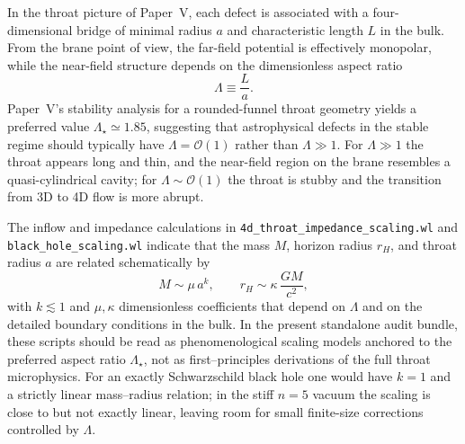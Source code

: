 \documentclass[11pt]{article}
\begin{document}
In the throat picture of Paper~V, each defect is associated with a
four-dimensional bridge of minimal radius \(a\) and characteristic length
\(L\) in the bulk.  From the brane point of view, the far-field potential is
effectively monopolar, while the near-field structure depends on the
dimensionless aspect ratio
\begin{equation}
  \Lambda \equiv \frac{L}{a}.
  \label{eq:aspect-ratio}
\end{equation}
Paper~V's stability analysis for a rounded-funnel throat geometry yields a preferred
value \(\Lambda_\star \simeq 1.85\), suggesting that astrophysical defects in the stable
regime should typically have \(\Lambda=\mathcal{O}(1)\) rather than \(\Lambda\gg 1\).
For \(\Lambda \gg 1\) the throat appears long and thin, and the near-field
region on the brane resembles a quasi-cylindrical cavity; for \(\Lambda \sim
\mathcal{O}(1)\) the throat is stubby and the transition from 3D to 4D flow
is more abrupt.

The inflow and impedance calculations in
\texttt{4d\_throat\_impedance\_scaling.wl} and\\
\texttt{black\_hole\_scaling.wl} indicate that the mass \(M\), horizon
radius \(r_H\), and throat radius \(a\) are related schematically by
\begin{equation}
  M \sim \mu\,a^{k},
  \qquad
  r_H \sim \kappa\,\frac{G M}{c^2},
  \label{eq:mass-scaling-generic}
\end{equation}
with \(k \lesssim 1\) and \(\mu, \kappa\) dimensionless coefficients that
depend on \(\Lambda\) and on the detailed boundary conditions in the bulk.
In the present standalone audit bundle, these scripts should be read as
phenomenological scaling models anchored to the preferred aspect ratio
\(\Lambda_\star\), not as first--principles derivations of the full throat
microphysics.
For an exactly Schwarzschild black hole one would have \(k = 1\) and a
strictly linear mass--radius relation; in the stiff \(n=5\) vacuum the
scaling is close to but not exactly linear, leaving room for small
finite-size corrections controlled by \(\Lambda\).
\end{document}
